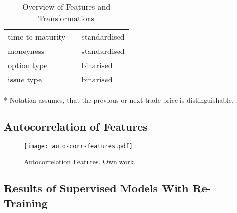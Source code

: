 \begin{table}[H]
\begin{threeparttable}
\begin{tabular}{@{}lll@{}}
            time to maturity        &                                                                                                  & standardised           \\
            moneyness               &                                                                                                  & standardised           \\
            option type             &                                                                                                  & binarised              \\
            issue type              &                                                                                                  & binarised              \\ \bottomrule
        \end{tabular}
        \begin{tablenotes}\footnotesize
            \item[*] Notation assumes, that the previous or next trade price is distinguishable.
        \end{tablenotes}
    \end{threeparttable}
    \caption[Overview of Features and Transformations]{Overview of Features and Transformations}
    \label{tab:features-transformations}
\end{table}

\newpage
\subsection{Autocorrelation of Features}
\label{app:autocorrelation-of-features}

\begin{figure}[ht]
    \centering
    \texttt{[image: auto-corr-features.pdf]}
    \caption[Autocorrelation of Features]{Autocorrelation Features. Own work.}
    \label{fig:auto-correlation-features}
\end{figure}

\newpage
\subsection{Results of Supervised Models With Re-Training}
\label{app:results-of-supervised-models-with-re-training}

